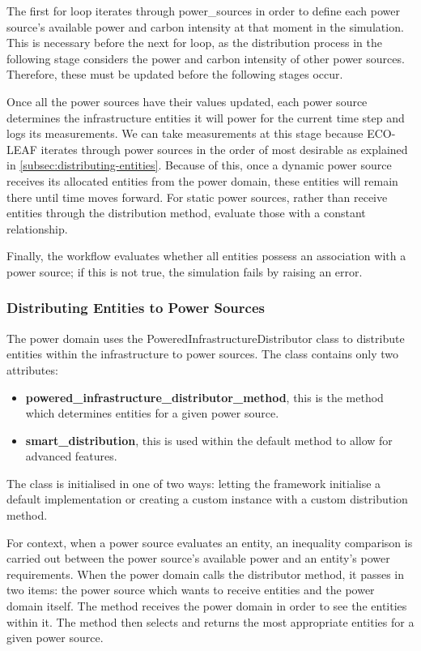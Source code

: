 \documentclass{l4proj}
\begin{document}
The first for loop iterates through power\_sources in order to define each power source's available power and carbon intensity at that moment in the simulation.
This is necessary before the next for loop, as the distribution process in the following stage considers the power and carbon intensity of other power sources. Therefore, these must be updated before the following stages occur.

Once all the power sources have their values updated, each power source determines the infrastructure entities it will power for the current time step and logs its measurements.
We can take measurements at this stage because ECO-LEAF iterates through power sources in the order of most desirable as explained in \ref{subsec:distributing-entities}.
Because of this, once a dynamic power source receives its allocated entities from the power domain, these entities will remain there until time moves forward.
For static power sources, rather than receive entities through the distribution method, evaluate those with a constant relationship.

Finally, the workflow evaluates whether all entities possess an association with a power source; if this is not true, the simulation fails by raising an error.
\subsubsection{Distributing Entities to Power Sources}\label{imp:subsec:distributor}
The power domain uses the PoweredInfrastructureDistributor class to distribute entities within the infrastructure to power sources.
The class contains only two attributes:
\begin{itemize}
    \item \textbf{powered\_infrastructure\_distributor\_method}, this is the method which determines entities for a given power source.
    \item \textbf{smart\_distribution}, this is used within the default method to allow for advanced features.
\end{itemize}
The class is initialised in one of two ways: letting the framework initialise a default implementation or creating a custom instance with a custom distribution method.

For context, when a power source evaluates an entity, an inequality comparison is carried out between the power source's available power and an entity's power requirements.
When the power domain calls the distributor method, it passes in two items: the power source which wants to receive entities and the power domain itself.
The method receives the power domain in order to see the entities within it.
The method then selects and returns the most appropriate entities for a given power source.
\end{document}

